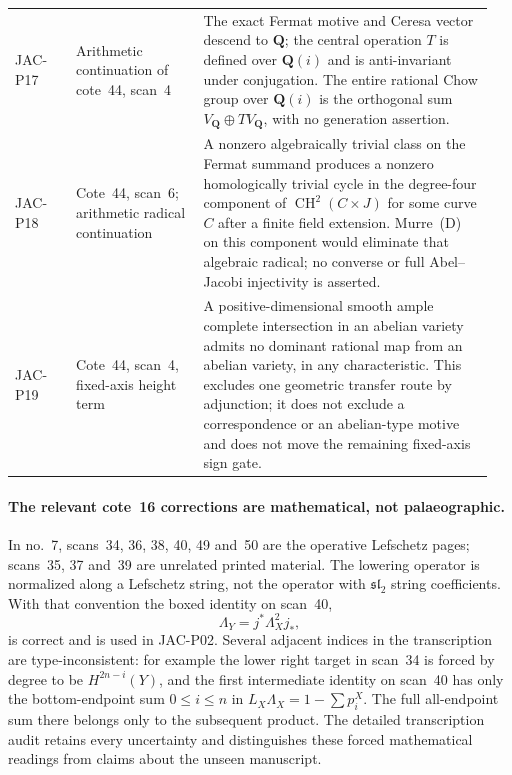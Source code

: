 \begin{longtable}{@{}p{0.12\linewidth}p{0.25\linewidth}p{0.58\linewidth}@{}}
JAC-P17 & Arithmetic continuation of cote~44, scan~4 &
The exact Fermat motive and Ceresa vector descend to $\mathbf Q$;
the central operation $T$ is defined over $\mathbf Q(i)$ and is
anti-invariant under conjugation. The entire rational Chow group
over $\mathbf Q(i)$ is the orthogonal sum $V_{\mathbf Q}\oplus
T V_{\mathbf Q}$, with no generation assertion.\\
JAC-P18 & Cote~44, scan~6; arithmetic radical continuation &
A nonzero algebraically trivial class on the Fermat summand
produces a nonzero homologically trivial cycle in the degree-four
component of $\operatorname{CH}^2(C\times J)$ for some curve $C$
after a finite field extension. Murre~(D) on this component would
eliminate that algebraic radical; no converse or full
Abel--Jacobi injectivity is asserted.\\
JAC-P19 & Cote~44, scan~4, fixed-axis height term &
A positive-dimensional smooth ample complete intersection in an
abelian variety admits no dominant rational map from an abelian
variety, in any characteristic. This excludes one geometric transfer
route by adjunction; it does not exclude a correspondence or an
abelian-type motive and does not move the remaining fixed-axis
sign gate.\\
\bottomrule
\end{longtable}
\endgroup

\paragraph{The relevant cote~16 corrections are mathematical, not palaeographic.}
In no.~7, scans~34, 36, 38, 40, 49 and~50 are the operative
Lefschetz pages; scans~35, 37 and~39 are unrelated printed
material. The lowering operator is normalized along a Lefschetz
string, not the operator with $\mathfrak{sl}_2$ string
coefficients. With that convention the boxed identity on scan~40,
\[
             \Lambda_Y=j^*\Lambda_X^2j_*,
\]
is correct and is used in JAC-P02. Several adjacent indices in
the transcription are type-inconsistent: for example the lower
right target in scan~34 is forced by degree to be
$H^{2n-i}(Y)$, and the first intermediate identity on scan~40
has only the bottom-endpoint sum $0\le i\le n$ in
$L_X\Lambda_X=1-\sum p_i^X$. The full all-endpoint sum there
belongs only to the subsequent product. The detailed
transcription audit retains every uncertainty and distinguishes
these forced mathematical readings from claims about the
unseen manuscript.
